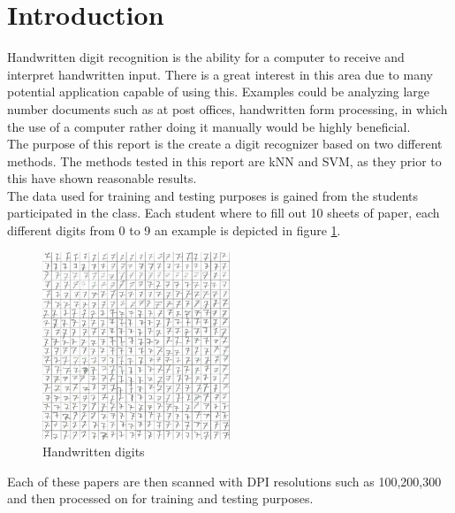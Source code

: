 \section{Introduction}
Handwritten digit recognition is the ability for a computer to receive and interpret handwritten input. There is a great interest in this area due to many potential application capable of using this. Examples could be analyzing large number documents such as at post offices, handwritten form processing, in which the use of a computer rather doing it manually would be highly beneficial.  \\

The purpose of this report is the create a digit recognizer based on two different methods.  The methods tested in this report are kNN and SVM, as they prior to this have shown reasonable results.\\

The data used for training and testing purposes is gained from the students participated in the class.  Each student where to fill out 10 sheets of paper, each different digits from 0 to 9 an example is depicted in figure \ref{fig:handwriten_digits}. 

\begin{figure}[H]
\centering
\includegraphics[width = 0.5\textwidth]{img/cropY2016G2M1-100-7.png}
\caption{Handwritten digits}
\label{fig:handwriten_digits}
\end{figure}

Each of these papers are then scanned with DPI resolutions such as 100,200,300 and then processed on for training and testing purposes. 
\newpage